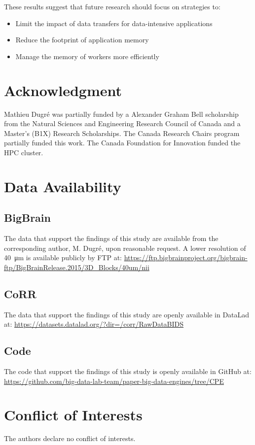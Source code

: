 \documentclass[AMA,STIX1COL]{WileyNJD-v2}
\begin{document}
These results suggest that future research should focus on strategies to:
\begin{itemize}
	\item Limit the impact of data transfers for data-intensive applications
	\item Reduce the footprint of application memory
	\item Manage the memory of workers more efficiently
\end{itemize}

\section*{Acknowledgment}
Mathieu Dugr\'e was partially funded by a Alexander Graham Bell scholarship from the Natural
Sciences and Engineering Research Council of Canada and a Master's (B1X) Research Scholarships.
The Canada Research Chairs program partially funded this work.
The Canada Foundation for Innovation funded the HPC cluster.

\section*{Data Availability}
\subsection*{BigBrain}
The data that support the findings of this study are available from the corresponding author, M. Dugr\'e, upon reasonable request.
A lower resolution of \SI{40}{\micro\metre} is available publicly by FTP at: 
\newline\href{https://ftp.bigbrainproject.org/bigbrain-ftp/BigBrainRelease.2015/3D_Blocks/40um/nii/}{https://ftp.bigbrainproject.org/bigbrain-ftp/BigBrainRelease.2015/3D\_Blocks/40um/nii}

\subsection*{CoRR}
The data that support the findings of this study are openly available in DataLad at:
\newline\href{https://datasets.datalad.org/?dir=/corr/RawDataBIDS}{https://datasets.datalad.org/?dir=/corr/RawDataBIDS}

\subsection*{Code}
The code that support the findings of this study is openly available in GitHub at:
\newline\href{https://github.com/big-data-lab-team/paper-big-data-engines/tree/CPE}{https://github.com/big-data-lab-team/paper-big-data-engines/tree/CPE}

\section*{Conflict of Interests}
The authors declare no conflict of interests.


\end{document}
